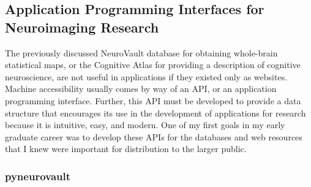 \documentclass{report}
\begin{document}
\subsection{Application Programming Interfaces for Neuroimaging Research}

The previously discussed NeuroVault database for obtaining whole-brain
statistical maps, or the Cognitive Atlas for providing a description of
cognitive neuroscience, are not useful in applications if they existed
only as websites. Machine accessibility usually comes by way of an API,
or an application programming interface. Further, this API must be
developed to provide a data structure that encourages its use in the
development of applications for research because it is intuitive, easy,
and modern. One of my first goals in my early graduate career was to
develop these APIs for the databases and web resources that I knew were
important for distribution to the larger public.

\subsubsection{pyneurovault}
\end{document}

